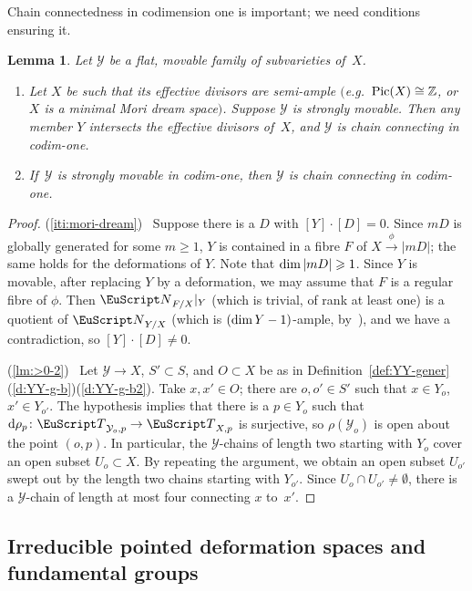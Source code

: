 \documentclass[10pt,a4paper]{article}
\numberwithin{equation}{section}
\newtheorem{m-lemma}[m-theorem]{Lemma}
\theoremstyle{definition}
\theoremstyle{remark}
\let\euf\EuScript %
\let\cal\mathcal
\let\mbb\mathbb
\let\ges\geqslant
\let\srel\stackrel
\renewcommand{\dim}{\mathop{\rm dim}\nolimits}
\newcommand{\rd}{{\rm d}}
\let\rst\vert
\newcommand{\eN}{{\euf N}}
\newcommand{\eT}{{\euf T}}
\newcommand{\cY}{{\cal Y}}
\newcommand{\XX}{X}
\newcommand{\YY}{Y}
\newcommand\Pic{\mathop{\rm Pic}\nolimits}
\begin{document}
Chain connectedness in codimension one is important; we need conditions ensuring it. 

\begin{m-lemma}\label{lm:>0} 
Let $\cY$ be a flat, movable family of subvarieties of\, $\XX$. 
\begin{enumerate}
\item\label{iti:mori-dream} 
  Let $\XX$ be such that its effective divisors are semi-ample $($e.g.\  $\Pic(\XX)\cong\mbb Z$, or $X$ is a minimal Mori dream space$)$. Suppose $\cY$ is strongly movable. Then any member $\YY$ intersects the effective divisors of\, $\XX$, and $\cY$ is chain connecting in codim-one. 
\item \label{lm:>0-2}
If\, $\cY$ is strongly movable in codim-one, then $\cY$ is chain connecting in codim-one. 
\end{enumerate}
\end{m-lemma}

\begin{proof}
(\ref{iti:mori-dream})~ Suppose there is a $D$ with $[\YY]\cdot[D]\!=\!0$. Since $mD$ is globally generated for some $m\ges1$, $\YY$ is contained in a fibre $F$ of $\XX\srel{\phi}{\to}|mD|$; the same holds for the deformations of $\YY$. Note that $\dim |mD|\ges1$. 
Since $\YY$ is movable, after replacing $\YY$ by a deformation, we may assume that $F$ is a regular fibre of $\phi$. Then $\eN_{F/\XX}\rst_\YY$ (which is trivial, of rank at least one) is a quotient of $\eN_{\YY/\XX}$ (which is $(\dim \YY-1)$-ample, by~\cite{hlc-g2}), and we have a contradiction, so $[\YY]\cdot[D]\!\neq\!0$.

(\ref{lm:>0-2})~ Let $\cY\to\XX$, $S'\subset S$, and $O\subset \XX$ be as in Definition~\ref{def:YY-gener}(\ref{d:YY-g-b})(\ref{d:YY-g-b2}). Take $x, x'\in O$; there are $o,o' \in S'$ such that $x\in\YY_o$, $x'\in\YY_{o'}$. The hypothesis implies that there is a $p\in\YY_o$ such that $\rd\rho_p\colon \eT_{\cY_o,p}\to\eT_{\XX,p}$ is surjective, so $\rho(\cY_o)$ is open about the point $(o,p)$. In particular, the $\cY$-chains of length two starting with $\YY_o$ cover an open subset $U_o\subset\XX$. By repeating the argument, we obtain an open subset $U_{o'}$ swept out by the length two chains starting with $\YY_{o'}$. Since $U_o\cap U_{o'}\neq\emptyset$, there is a $\cY$-chain of length at most four connecting $x$ to~$x'$. 
\end{proof}

\subsection{Irreducible pointed deformation spaces and fundamental groups} \label{ssct:irr} 
\end{document}
